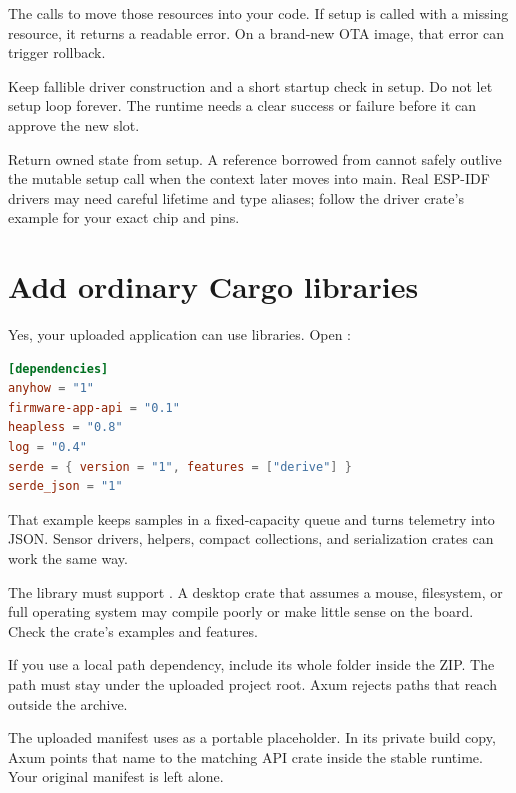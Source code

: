 The calls to  move those resources into your code. If setup is called with a missing resource, it returns a readable error. On a brand-new OTA image, that error can trigger rollback.

Keep fallible driver construction and a short startup check in setup. Do not let setup loop forever. The runtime needs a clear success or failure before it can approve the new slot.

\begin{warningbox}
Return owned state from setup. A reference borrowed from  cannot safely outlive the mutable setup call when the context later moves into main. Real ESP-IDF drivers may need careful lifetime and type aliases; follow the driver crate's example for your exact chip and pins.
\end{warningbox}

\section{Add ordinary Cargo libraries}

Yes, your uploaded application can use libraries. Open :

\begin{lstlisting}[language=TOML,numbers=none]
[dependencies]
anyhow = "1"
firmware-app-api = "0.1"
heapless = "0.8"
log = "0.4"
serde = { version = "1", features = ["derive"] }
serde_json = "1"
\end{lstlisting}

That example keeps samples in a fixed-capacity queue and turns telemetry into JSON. Sensor drivers,  helpers, compact collections, and serialization crates can work the same way.

The library must support . A desktop crate that assumes a mouse, filesystem, or full operating system may compile poorly or make little sense on the board. Check the crate's examples and features.

If you use a local path dependency, include its whole folder inside the ZIP. The path must stay under the uploaded project root. Axum rejects paths that reach outside the archive.

\begin{mentorbox}
The uploaded manifest uses  as a portable placeholder. In its private build copy, Axum points that name to the matching API crate inside the stable runtime. Your original manifest is left alone.
\end{mentorbox}


